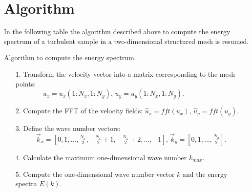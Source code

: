 \section*{Algorithm}
In the following table the algorithm described above to compute the energy spectrum of a turbulent sample in a two-dimensional structured mesh is resumed.
\begin{algorithm}
\label{alg-energy_spectrum}
\caption{Algorithm to compute the energy spectrum.}
\begin{itemize}
\item[1.] Transform the velocity vector into a matrix corresponding to the mesh points:\\
$\quad\quad\quad\quad u_x=u_x(1:N_x,1:N_y)$,  $u_y=u_y(1:N_x,1:N_y)$.\\
\item[2.] Compute the FFT of the velocity fields: $\hat{u}_x=fft(u_x)$, $\hat{u}_y=fft(u_y)$.\\
\item[3.] Define the wave number vectors:\\
$\quad\quad\quad\vec{k}_x=\left[0,1,...,\frac{N_x}{2},-\frac{N_x}{2}+1,-\frac{N_x}{2}+2,...,-1\right]$, $\vec{k}_y=\left[0,1,...,\frac{N_y}{2}\right]$.\\
\item[4.] Calculate the maximum one-dimensional wave number $k_{max}$.\\
\item[5.] Compute the one-dimensional wave number vector $k$ and the energy spectra $E(k)$.\\
\end{itemize}
\end{algorithm}
